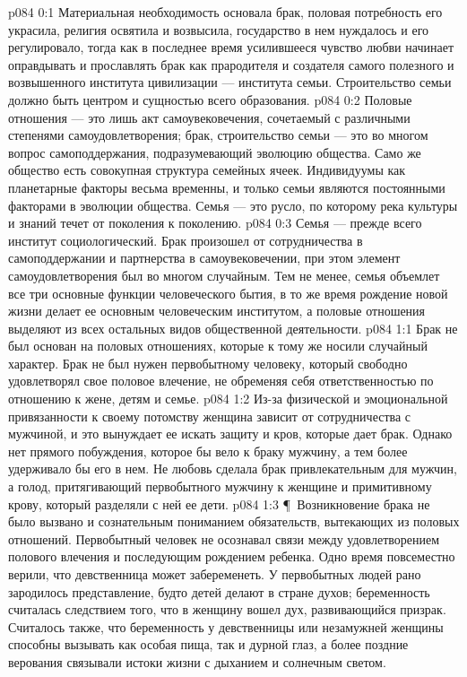 \vs p084 0:1 Материальная необходимость основала брак, половая потребность его украсила, религия освятила и возвысила, государство в нем нуждалось и его регулировало, тогда как в последнее время усилившееся чувство любви начинает оправдывать и прославлять брак как прародителя и создателя самого полезного и возвышенного института цивилизации --- института семьи. Строительство семьи должно быть центром и сущностью всего образования.
\vs p084 0:2 Половые отношения --- это лишь акт самоувековечения, сочетаемый с различными степенями самоудовлетворения; брак, строительство семьи --- это во многом вопрос самоподдержания, подразумевающий эволюцию общества. Само же общество есть совокупная структура семейных ячеек. Индивидуумы как планетарные факторы весьма временны, и только семьи являются постоянными факторами в эволюции общества. Семья --- это русло, по которому река культуры и знаний течет от поколения к поколению.
\vs p084 0:3 Семья --- прежде всего институт социологический. Брак произошел от сотрудничества в самоподдержании и партнерства в самоувековечении, при этом элемент самоудовлетворения был во многом случайным. Тем не менее, семья объемлет все три основные функции человеческого бытия, в то же время рождение новой жизни делает ее основным человеческим институтом, а половые отношения выделяют из всех остальных видов общественной деятельности.
\vs p084 1:1 Брак не был основан на половых отношениях, которые к тому же носили случайный характер. Брак не был нужен первобытному человеку, который свободно удовлетворял свое половое влечение, не обременяя себя ответственностью по отношению к жене, детям и семье.
\vs p084 1:2 Из\hyp{}за физической и эмоциональной привязанности к своему потомству женщина зависит от сотрудничества с мужчиной, и это вынуждает ее искать защиту и кров, которые дает брак. Однако нет прямого побуждения, которое бы вело к браку мужчину, а тем более удерживало бы его в нем. Не любовь сделала брак привлекательным для мужчин, а голод, притягивающий первобытного мужчину к женщине и примитивному крову, который разделяли с ней ее дети.
\vs p084 1:3 \P\ Возникновение брака не было вызвано и сознательным пониманием обязательств, вытекающих из половых отношений. Первобытный человек не осознавал связи между удовлетворением полового влечения и последующим рождением ребенка. Одно время повсеместно верили, что девственница может забеременеть. У первобытных людей рано зародилось представление, будто детей делают в стране духов; беременность считалась следствием того, что в женщину вошел дух, развивающийся призрак. Считалось также, что беременность у девственницы или незамужней женщины способны вызывать как особая пища, так и дурной глаз, а более поздние верования связывали истоки жизни с дыханием и солнечным светом.
